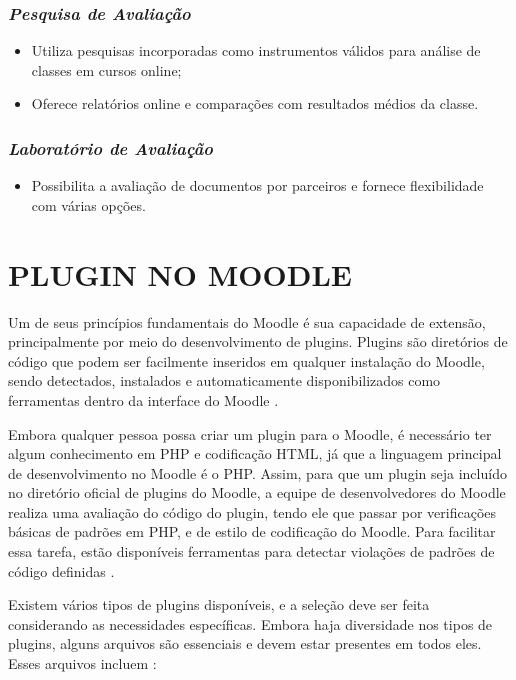 \subsubsection{\textbf{\textit{Pesquisa de Avaliação}}}

\begin{itemize}
    \item Utiliza pesquisas incorporadas como instrumentos válidos para análise de classes em cursos online;
    \item Oferece relatórios online e comparações com resultados médios da classe.
\end{itemize}


\subsubsection{\textbf{\textit{Laboratório de Avaliação}}}

\begin{itemize}
    \item Possibilita a avaliação de documentos por parceiros e fornece flexibilidade com várias opções.
\end{itemize}

\section{PLUGIN NO MOODLE}

Um de seus princípios fundamentais do Moodle é sua capacidade de extensão, principalmente por meio do desenvolvimento de plugins. Plugins são diretórios de código que podem ser facilmente inseridos em qualquer instalação do Moodle, sendo detectados, instalados e automaticamente disponibilizados como ferramentas dentro da interface do Moodle \cite{moodle}. 

Embora qualquer pessoa possa criar um plugin para o Moodle, é necessário ter algum conhecimento em PHP e codificação HTML, já que a linguagem principal de desenvolvimento no Moodle é o PHP. Assim, para que um plugin seja incluído no diretório oficial de plugins do Moodle, a equipe de desenvolvedores do Moodle realiza uma avaliação do código do plugin, tendo ele que passar por verificações básicas de padrões em PHP, e de estilo de codificação do Moodle. Para facilitar essa tarefa, estão disponíveis ferramentas para detectar violações de padrões de código definidas \cite{moodle}.

Existem vários tipos de plugins disponíveis, e a seleção deve ser feita considerando as necessidades específicas. Embora haja diversidade nos tipos de plugins, alguns arquivos são essenciais e devem estar presentes em todos eles. Esses arquivos incluem \cite{moodle}:


